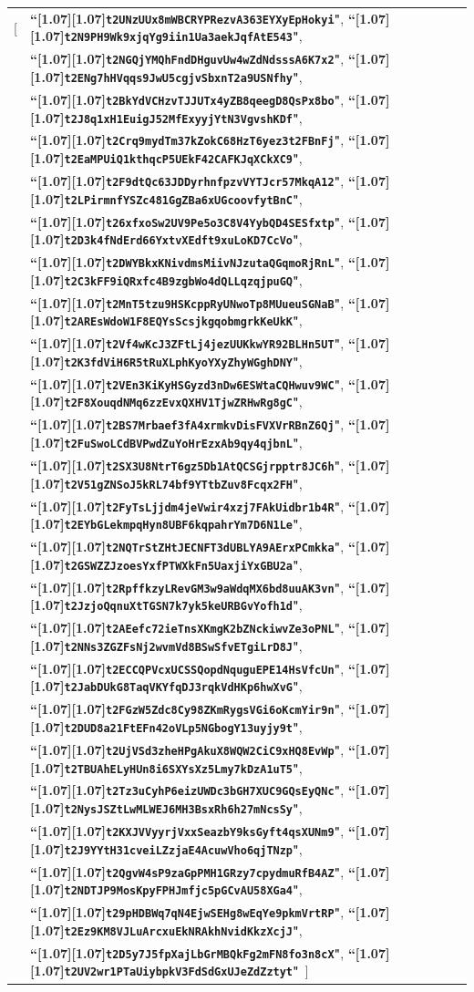 \documentclass{article}
\let\oldtexttt\texttt
\renewcommand{\texttt}[1]{\scalebox{1.02}[1.07]{\oldtexttt{#1}}}
\newcommand{\ascii}[1]{\textbf{``\texttt{#1}"}}
\begin{document}
\begin{tabular}{@{\hskip 2.5em}l@{\;}l}
[& \ascii{t2UNzUUx8mWBCRYPRezvA363EYXyEpHokyi}, \ascii{t2N9PH9Wk9xjqYg9iin1Ua3aekJqfAtE543}, \\
 & \ascii{t2NGQjYMQhFndDHguvUw4wZdNdsssA6K7x2}, \ascii{t2ENg7hHVqqs9JwU5cgjvSbxnT2a9USNfhy}, \\
 & \ascii{t2BkYdVCHzvTJJUTx4yZB8qeegD8QsPx8bo}, \ascii{t2J8q1xH1EuigJ52MfExyyjYtN3VgvshKDf}, \\
 & \ascii{t2Crq9mydTm37kZokC68HzT6yez3t2FBnFj}, \ascii{t2EaMPUiQ1kthqcP5UEkF42CAFKJqXCkXC9}, \\
 & \ascii{t2F9dtQc63JDDyrhnfpzvVYTJcr57MkqA12}, \ascii{t2LPirmnfYSZc481GgZBa6xUGcoovfytBnC}, \\
 & \ascii{t26xfxoSw2UV9Pe5o3C8V4YybQD4SESfxtp}, \ascii{t2D3k4fNdErd66YxtvXEdft9xuLoKD7CcVo}, \\
 & \ascii{t2DWYBkxKNivdmsMiivNJzutaQGqmoRjRnL}, \ascii{t2C3kFF9iQRxfc4B9zgbWo4dQLLqzqjpuGQ}, \\
 & \ascii{t2MnT5tzu9HSKcppRyUNwoTp8MUueuSGNaB}, \ascii{t2AREsWdoW1F8EQYsScsjkgqobmgrkKeUkK}, \\
 & \ascii{t2Vf4wKcJ3ZFtLj4jezUUKkwYR92BLHn5UT}, \ascii{t2K3fdViH6R5tRuXLphKyoYXyZhyWGghDNY}, \\
 & \ascii{t2VEn3KiKyHSGyzd3nDw6ESWtaCQHwuv9WC}, \ascii{t2F8XouqdNMq6zzEvxQXHV1TjwZRHwRg8gC}, \\
 & \ascii{t2BS7Mrbaef3fA4xrmkvDisFVXVrRBnZ6Qj}, \ascii{t2FuSwoLCdBVPwdZuYoHrEzxAb9qy4qjbnL}, \\
 & \ascii{t2SX3U8NtrT6gz5Db1AtQCSGjrpptr8JC6h}, \ascii{t2V51gZNSoJ5kRL74bf9YTtbZuv8Fcqx2FH}, \\
 & \ascii{t2FyTsLjjdm4jeVwir4xzj7FAkUidbr1b4R}, \ascii{t2EYbGLekmpqHyn8UBF6kqpahrYm7D6N1Le}, \\
 & \ascii{t2NQTrStZHtJECNFT3dUBLYA9AErxPCmkka}, \ascii{t2GSWZZJzoesYxfPTWXkFn5UaxjiYxGBU2a}, \\
 & \ascii{t2RpffkzyLRevGM3w9aWdqMX6bd8uuAK3vn}, \ascii{t2JzjoQqnuXtTGSN7k7yk5keURBGvYofh1d}, \\
 & \ascii{t2AEefc72ieTnsXKmgK2bZNckiwvZe3oPNL}, \ascii{t2NNs3ZGZFsNj2wvmVd8BSwSfvETgiLrD8J}, \\
 & \ascii{t2ECCQPVcxUCSSQopdNquguEPE14HsVfcUn}, \ascii{t2JabDUkG8TaqVKYfqDJ3rqkVdHKp6hwXvG}, \\
 & \ascii{t2FGzW5Zdc8Cy98ZKmRygsVGi6oKcmYir9n}, \ascii{t2DUD8a21FtEFn42oVLp5NGbogY13uyjy9t}, \\
 & \ascii{t2UjVSd3zheHPgAkuX8WQW2CiC9xHQ8EvWp}, \ascii{t2TBUAhELyHUn8i6SXYsXz5Lmy7kDzA1uT5}, \\
 & \ascii{t2Tz3uCyhP6eizUWDc3bGH7XUC9GQsEyQNc}, \ascii{t2NysJSZtLwMLWEJ6MH3BsxRh6h27mNcsSy}, \\
 & \ascii{t2KXJVVyyrjVxxSeazbY9ksGyft4qsXUNm9}, \ascii{t2J9YYtH31cveiLZzjaE4AcuwVho6qjTNzp}, \\
 & \ascii{t2QgvW4sP9zaGpPMH1GRzy7cpydmuRfB4AZ}, \ascii{t2NDTJP9MosKpyFPHJmfjc5pGCvAU58XGa4}, \\
 & \ascii{t29pHDBWq7qN4EjwSEHg8wEqYe9pkmVrtRP}, \ascii{t2Ez9KM8VJLuArcxuEkNRAkhNvidKkzXcjJ}, \\
 & \ascii{t2D5y7J5fpXajLbGrMBQkFg2mFN8fo3n8cX}, \ascii{t2UV2wr1PTaUiybpkV3FdSdGxUJeZdZztyt}\, ]
\end{tabular}
\end{document}
